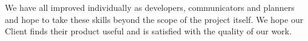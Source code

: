 \documentclass{l3proj}
\begin{document}
We have all improved individually as developers, communicators and planners and hope to take these skills beyond the scope of the project itself. We hope our Client finds their product useful and is satisfied with the quality of our work.



\end{document}

